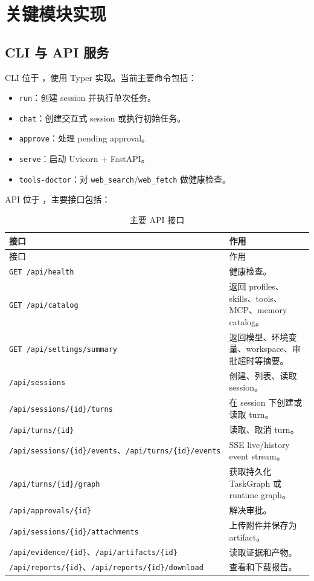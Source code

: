 \documentclass[UTF8,zihao=-4,a4paper,fontset=none]{ctexart}
\newcommand{\code}[1]{\texttt{\footnotesize #1}}
\begin{document}
\section{关键模块实现}

\subsection{CLI 与 API 服务}

CLI 位于 ，使用 Typer 实现。当前主要命令包括：

\begin{itemize}
  \item \code{run}：创建 session 并执行单次任务。
  \item \code{chat}：创建交互式 session 或执行初始任务。
  \item \code{approve}：处理 pending approval。
  \item \code{serve}：启动 Uvicorn + FastAPI。
  \item \code{tools-doctor}：对 \code{web\_search}/\code{web\_fetch} 做健康检查。
\end{itemize}

API 位于 ，主要接口包括：

\begin{longtable}{p{}p{}}
\caption{主要 API 接口}\label{tab:api}\\
\toprule
接口 & 作用 \\
\midrule
\endfirsthead
\toprule
接口 & 作用 \\
\midrule
\endhead
\code{GET /api/health} & 健康检查。 \\
\code{GET /api/catalog} & 返回 profiles、skills、tools、MCP、memory catalog。 \\
\code{GET /api/settings/summary} & 返回模型、环境变量、workspace、审批超时等摘要。 \\
\code{/api/sessions} & 创建、列表、读取 session。 \\
\code{/api/sessions/\{id\}/turns} & 在 session 下创建或读取 turn。 \\
\code{/api/turns/\{id\}} & 读取、取消 turn。 \\
\code{/api/sessions/\{id\}/events}、\code{/api/turns/\{id\}/events} & SSE live/history event stream。 \\
\code{/api/turns/\{id\}/graph} & 获取持久化 TaskGraph 或 runtime graph。 \\
\code{/api/approvals/\{id\}} & 解决审批。 \\
\code{/api/sessions/\{id\}/attachments} & 上传附件并保存为 artifact。 \\
\code{/api/evidence/\{id\}}、\code{/api/artifacts/\{id\}} & 读取证据和产物。 \\
\code{/api/reports/\{id\}}、\code{/api/reports/\{id\}/download} & 查看和下载报告。 \\
\bottomrule
\end{longtable}
\end{document}
